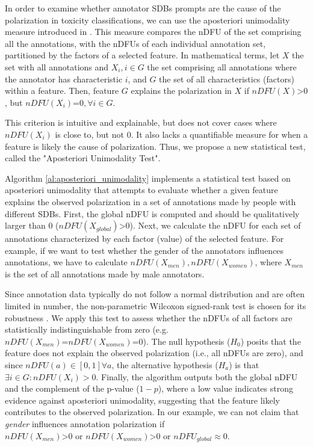 In order to examine whether annotator \acp{SDB} prompts are the cause of the polarization in toxicity classifications, we can use the aposteriori unimodality measure introduced in \citet{pavlopoulos-likas-2024-polarized}. This measure compares the \ac{nDFU} of the set comprising all the annotations, with the \acp{nDFU} of each individual annotation set, partitioned by the factors of a selected feature. In mathematical terms, let $X$ the set with all annotations and $X_i, i \in G$ the set comprising all annotations where the annotator has characteristic $i$, and $G$ the set of all characteristics (factors) within a feature. Then, feature $G$ explains the polarization in $X$ if $nDFU(X) \text{>} 0$, but $nDFU(X_i) \text{=} 0, \forall i \in G$. 

This criterion is intuitive and explainable, but does not cover cases where $nDFU(X_i)$ is close to, but not $0$. It also lacks a quantifiable measure for when a feature is likely the cause of polarization. Thus, we propose a new statistical test, called the "Aposteriori Unimodality Test". 

Algorithm \ref{al:aposteriori_unimodality} implements a statistical test based on aposteriori unimodality that attempts to evaluate whether a given feature explains the observed polarization in a set of annotations made by people with different \acp{SDB}. First, the global \ac{nDFU} is computed and should be qualitatively larger than $0$ ($nDFU(X_{global}) \text{>} 0$). Next, we calculate the \ac{nDFU} for each set of annotations characterized by each factor (value) of the selected feature. For example, if we want to test whether the gender of the annotators influences annotations, we have to calculate $nDFU(X_{men}), nDFU(X_{women})$, where $X_{men}$ is the set of all annotations made by male annotators. 

Since annotation data typically do not follow a normal distribution and are often limited in number, the non-parametric Wilcoxon signed-rank test is chosen for its robustness \cite{Rey2011}. We apply this test to assess whether the \acp{nDFU} of all factors are statistically indistinguishable from zero (e.g. $nDFU(X_{men}) \text{=} nDFU(X_{women}) \text{=} 0$). The null hypothesis ($H_0$) posits that the feature does not explain the observed polarization (i.e., all \acp{nDFU} are zero), and since $nDFU(a) \in [0,1] \forall a$, the alternative hypothesis ($H_a$) is that $\exists i \in G: nDFU(X_i) > 0$. Finally, the algorithm outputs both the global \ac{nDFU} and the complement of the p-value ($1 - p$), where a low value indicates strong evidence against aposteriori unimodality, suggesting that the feature likely contributes to the observed polarization. In our example, we can not claim that \textit{gender} influences annotation polarization if $nDFU(X_{men}) \text{>} 0 \text{ or } nDFU(X_{women}) \text{>} 0 \text{ or } nDFU_{global} \approx 0$.

